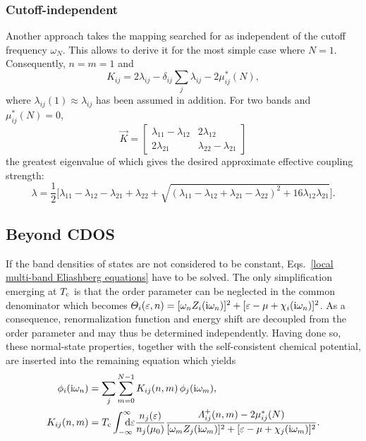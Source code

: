 \subsubsection{Cutoff-independent}
\label{cutoff-independent}

Another approach takes the mapping searched for as independent of the cutoff
frequency $\omega_N$. This allows to derive it for the most simple case where
$N = 1$. Consequently, $n = m = 1$ and
%
\begin{equation*}
    K_{i j} = 2 \lambda_{i j} - \delta_{i j} \sum_j \lambda_{i j}
    - 2 \mu^*_{i j}(N),
\end{equation*}
%
where $\lambda_{i j}(1) \approx \lambda_{i j}$ has been assumed in addition.
For two bands and $\mu^*_{i j}(N) = 0$,
%
\begin{equation*}
    \vec K = \begin{bmatrix}
        \lambda_{1 1} - \lambda_{1 2} & 2 \lambda_{1 2} \\
        2 \lambda_{2 1} & \lambda_{2 2} - \lambda_{2 1}
    \end{bmatrix}
\end{equation*}
%
the greatest eigenvalue of which gives the desired approximate effective
coupling strength:
%
\begin{equation*}
    \lambda = \frac 1 2 \Big[
        \lambda_{1 1} - \lambda_{1 2} - \lambda_{2 1} + \lambda_{2 2} + \sqrt{
            (\lambda_{1 1} - \lambda_{1 2} + \lambda_{2 1} - \lambda_{2 2})^2
            + 16 \lambda_{1 2} \lambda_{2 1}
            }
    \Big].
\end{equation*}

\subsection{Beyond CDOS}

If the band densities of states are not considered to be constant,
Eqs.~\ref{local multi-band Eliashberg equations} have to be solved. The only
simplification emerging at $T \sb{\text{c}}$ is that the order parameter can be
neglected in the common denominator which becomes $\varTheta_i(\varepsilon, n) =
[\omega_n Z_i(\mathrm i \omega_n)]^2 + [\varepsilon - \mu + \chi_i(\mathrm i \omega_n)]^2$. As a
consequence, renormalization function and energy shift are decoupled from the
order parameter and may thus be determined independently. Having done so, these
normal-state properties, together with the self-consistent chemical potential,
are inserted into the remaining equation which yields
%
\begin{equation} \label{linearized gap equation}
    \begin{split}
        \phi_i(\I \omega_n) &= \sum_j \sum_{m = 0}^{N - 1}
        K_{i j}(n, m) \, \phi_j(\I \omega_m),
        \\
        K_{i j}(n, m) &= T \sub c \int \from{-\infty} \till \infty \D \epsilon
        \frac{n_j(\epsilon)}{n_j(\mu_0)}
        \frac {\Lambda_{i j}^+(n, m) - 2 \mu^*_{i j}(N)}
        {[\omega_m Z_j(\I \omega_m)]^2 + [\epsilon - \mu + \chi_j(\I \omega_m)]^2}.
    \end{split}
\end{equation}

